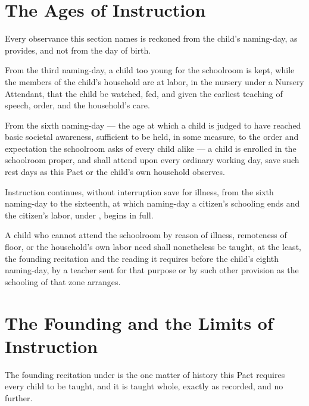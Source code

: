 \section{The Ages of Instruction}
\label{sec:schooling:ages-of-instruction}

Every observance this section names is reckoned from the child's naming-day, as  provides, and not from the day of birth.

\begin{clauses}
\item From the third naming-day, a child too young for the schoolroom is kept, while the members of the child's household are at labor, in the nursery under a Nursery Attendant, that the child be watched, fed, and given the earliest teaching of speech, order, and the household's care.
\item From the sixth naming-day --- the age at which a child is judged to have reached basic societal awareness, sufficient to be held, in some measure, to the order and expectation the schoolroom asks of every child alike --- a child is enrolled in the schoolroom proper, and shall attend upon every ordinary working day, save such rest days as this Pact or the child's own household observes.
\item Instruction continues, without interruption save for illness, from the sixth naming-day to the sixteenth, at which naming-day a citizen's schooling ends and the citizen's labor, under , begins in full.
\item A child who cannot attend the schoolroom by reason of illness, remoteness of floor, or the household's own labor need shall nonetheless be taught, at the least, the founding recitation and the reading it requires before the child's eighth naming-day, by a teacher sent for that purpose or by such other provision as the schooling of that zone arranges.
\end{clauses}

\section{The Founding and the Limits of Instruction}
\label{sec:schooling:founding-and-the-limits-of-instruction}

The founding recitation under  is the one matter of history this Pact requires every child to be taught, and it is taught whole, exactly as recorded, and no further.

